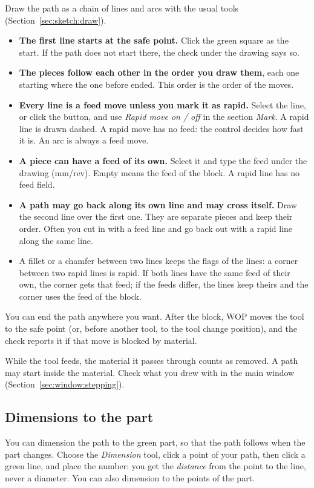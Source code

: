 Draw the path as a chain of lines and arcs with the usual tools (Section~\ref{sec:sketch:draw}).

\begin{itemize}
\item \textbf{The first line starts at the safe point.} Click the green square as the start. If the path does not start there, the check under the drawing says so.
\item \textbf{The pieces follow each other in the order you draw them}, each one starting where the one before ended. This order is the order of the moves.
\item \textbf{Every line is a feed move unless you mark it as rapid.} Select the line, or click the button, and use \emph{Rapid move on / off} in the section \emph{Mark}. A rapid line is drawn dashed. A rapid move has no feed: the control decides how fast it is. An arc is always a feed move.
\item \textbf{A piece can have a feed of its own.} Select it and type the feed under the drawing (mm/rev). Empty means the feed of the block. A rapid line has no feed field.
\item \textbf{A path may go back along its own line and may cross itself.} Draw the second line over the first one. They are separate pieces and keep their order. Often you cut in with a feed line and go back out with a rapid line along the same line.
\item A fillet or a chamfer between two lines keeps the flags of the lines: a corner between two rapid lines is rapid. If both lines have the same feed of their own, the corner gets that feed; if the feeds differ, the lines keep theirs and the corner uses the feed of the block.
\end{itemize}

You can end the path anywhere you want. After the block, WOP moves the tool to the safe point (or, before another tool, to the tool change position), and the check reports it if that move is blocked by material.

\begin{notebox}
While the tool feeds, the material it passes through counts as removed. A path may start inside the material. Check what you drew with  in the main window (Section~\ref{sec:window:stepping}).
\end{notebox}

\subsection{Dimensions to the part}
You can dimension the path to the green part, so that the path follows when the part changes. Choose the \emph{Dimension} tool, click a point of your path, then click a green line, and place the number: you get the \emph{distance} from the point to the line, never a diameter. You can also dimension to the points of the part.

